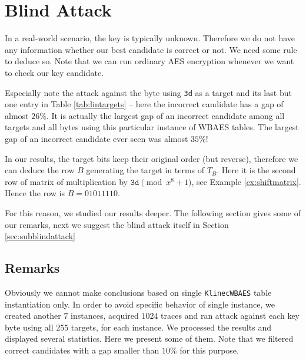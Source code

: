 \section{Blind Attack}
\label{sec:blindattack}

In a real-world scenario, the key is typically unknown. Therefore we do not have any information whether our best candidate is correct or not. We need some rule to deduce so. Note that we can run ordinary AES encryption whenever we want to check our key candidate.

\begin{remark}
\label{rem:false}
	Especially note the attack against the  byte using {\tt 3d} as a target and its last but one entry in Table \ref{tab:lintargets} -- here the incorrect candidate has a gap of almost $26\%$. It is actually the largest gap of an incorrect candidate among all targets and all bytes using this particular instance of WBAES tables. The largest gap of an incorrect candidate ever seen was almost $35\%$!
	
	In our results, the target bits keep their original order (but reverse), therefore we can deduce the row $B$ generating the target in terms of $T_B$. Here it is the second row of matrix of multiplication by $\texttt{3d}\pmod{x^8+1}$, see Example \ref{ex:shiftmatrix}. Hence the row is $B = 01011110$.
\end{remark}

For this reason, we studied our results deeper. The following section gives some of our remarks, next we suggest the blind attack itself in Section \ref{sec:subblindattack}



\subsection{Remarks}
\label{sec:remarks}

Obviously we cannot make conclusions based on single {\tt KlinecWBAES} table instantiation only. In order to avoid specific behavior of single instance, we created another $7$ instances, acquired $1024$ traces and ran attack against each key byte using all $255$ targets, for each instance. We processed the results and displayed several statistics. Here we present some of them. Note that we filtered correct candidates with a gap smaller than $10\%$ for this purpose.

